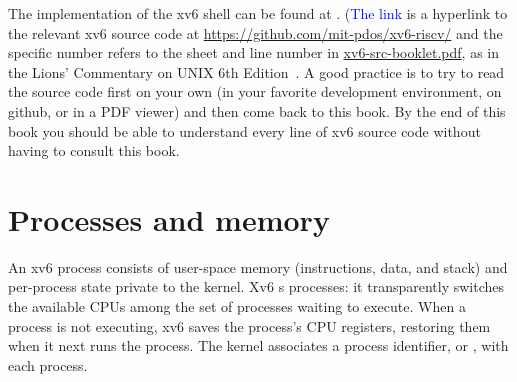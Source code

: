 The implementation of the xv6 shell can be found at
. (\textcolor{blue}{The link} is a hyperlink to
the relevant xv6 source code at
\url{https://github.com/mit-pdos/xv6-riscv/} and the specific number
refers to the sheet and line number in
\href{xv6-src-booklet.pdf}{xv6-src-booklet.pdf}, as in the Lions'
Commentary on UNIX 6th Edition~\cite{lions}. A good practice is to try
to read the source code first on your own (in your favorite
development environment, on github, or in a PDF viewer) and then come
back to this book.  By the end of this book you should be able to
understand every line of xv6 source code without having to consult this
book.


\section{Processes and memory}

An xv6 process consists of user-space memory (instructions, data, and stack)
and per-process state private to the kernel.
Xv6 
s
processes: it transparently switches the available CPUs
among the set of processes waiting to execute.
When a process is not executing, xv6 saves the process's CPU registers,
restoring them when it next runs the process.
The kernel associates a process identifier, or
,
with each process.

